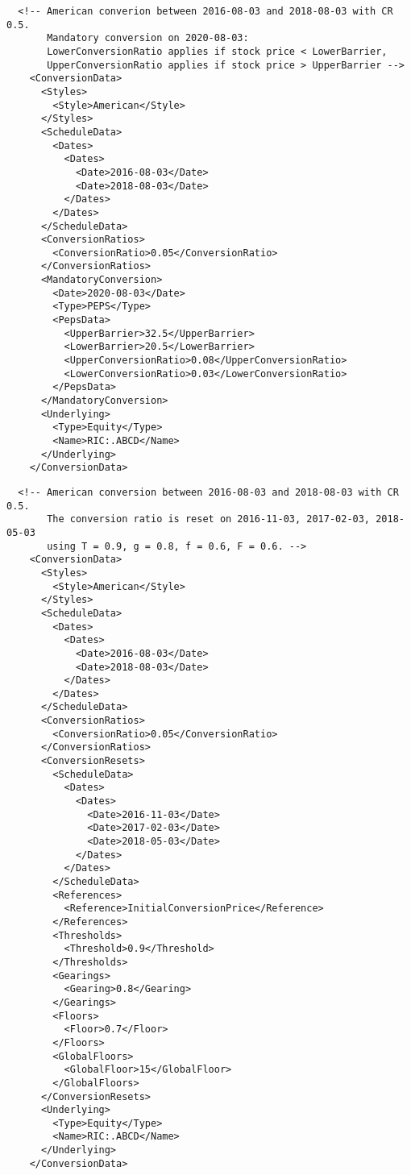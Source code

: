 \begin{listing}[H]
\begin{verbatim}
  <!-- American converion between 2016-08-03 and 2018-08-03 with CR 0.5.
       Mandatory conversion on 2020-08-03:
       LowerConversionRatio applies if stock price < LowerBarrier,
       UpperConversionRatio applies if stock price > UpperBarrier -->
    <ConversionData>
      <Styles>
        <Style>American</Style>
      </Styles>
      <ScheduleData>
        <Dates>
          <Dates>
            <Date>2016-08-03</Date>
            <Date>2018-08-03</Date>
          </Dates>
        </Dates>
      </ScheduleData>
      <ConversionRatios>
        <ConversionRatio>0.05</ConversionRatio>
      </ConversionRatios>
      <MandatoryConversion>
        <Date>2020-08-03</Date>
        <Type>PEPS</Type>
        <PepsData>
          <UpperBarrier>32.5</UpperBarrier>
          <LowerBarrier>20.5</LowerBarrier>
          <UpperConversionRatio>0.08</UpperConversionRatio>
          <LowerConversionRatio>0.03</LowerConversionRatio>
        </PepsData>
      </MandatoryConversion>
      <Underlying>
        <Type>Equity</Type>
        <Name>RIC:.ABCD</Name>
      </Underlying>
    </ConversionData>
\end{verbatim}
\caption{Convertible bond conversion example 4}
\label{lst:convertiblebonddata_conversion_4}
\end{listing}

\begin{listing}[H]
\begin{verbatim}
  <!-- American conversion between 2016-08-03 and 2018-08-03 with CR 0.5.
       The conversion ratio is reset on 2016-11-03, 2017-02-03, 2018-05-03
       using T = 0.9, g = 0.8, f = 0.6, F = 0.6. -->
    <ConversionData>
      <Styles>
        <Style>American</Style>
      </Styles>
      <ScheduleData>
        <Dates>
          <Dates>
            <Date>2016-08-03</Date>
            <Date>2018-08-03</Date>
          </Dates>
        </Dates>
      </ScheduleData>
      <ConversionRatios>
        <ConversionRatio>0.05</ConversionRatio>
      </ConversionRatios>
      <ConversionResets>
        <ScheduleData>
          <Dates>
            <Dates>
              <Date>2016-11-03</Date>
              <Date>2017-02-03</Date>
              <Date>2018-05-03</Date>
            </Dates>
          </Dates>
        </ScheduleData>
        <References>
          <Reference>InitialConversionPrice</Reference>
        </References>
        <Thresholds>
          <Threshold>0.9</Threshold>
        </Thresholds>
        <Gearings>
          <Gearing>0.8</Gearing>
        </Gearings>
        <Floors>
          <Floor>0.7</Floor>
        </Floors>
        <GlobalFloors>
          <GlobalFloor>15</GlobalFloor>
        </GlobalFloors>
      </ConversionResets>
      <Underlying>
        <Type>Equity</Type>
        <Name>RIC:.ABCD</Name>
      </Underlying>
    </ConversionData>
\end{verbatim}
\caption{Convertible bond conversion example 5}
\label{lst:convertiblebonddata_conversion_5}
\end{listing}

